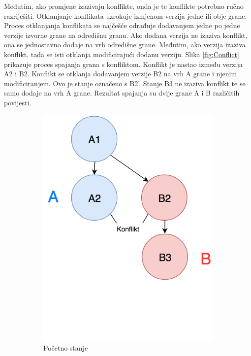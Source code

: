 \documentclass[times, utf8, diplomski, numeric]{fer}
\begin{document}
Međutim, ako promjene izazivaju konflikte, onda je te konflikte potrebno ručno razriješiti. Otklanjanje konflikata uzrokuje izmjenom verzija jedne ili obje grane. Proces otklanjanja konflikata se najčešće odrađuje dodavanjem jedne po jedne verzije izvorne grane na odredišnu granu. Ako dodana verzija ne izaziva konflikt, ona se jednostavno dodaje na vrh odredišne grane. Međutim, ako verzija izaziva konflikt, tada se isti otklanja modificirajući dodanu verziju. Slika \ref{fig:Conflict} prikazuje proces spajanja grana s konfliktom. Konflikt je nastao između verzija A2 i B2. Konflikt se otklanja dodavanjem verzije B2 na vrh A grane i njenim modificiranjem. Ovo je stanje označeno s B2'. Stanje B3 ne izaziva konflikt te se samo dodaje na vrh A grane. Rezultat spajanja su dvije grane A i B različitih povijesti.

\begin{figure}[h!]
\centering
\begin{subfigure}{.3\textwidth}
\centering
\includegraphics[scale=0.5]{RebaseA}
\caption{Početno stanje}
\label{fig:RebaseA}
\end{subfigure}
\begin{subfigure}{.3\textwidth}

\end{subfigure}
\end{figure}
\end{document}
